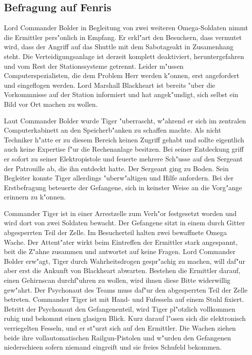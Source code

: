 \subsection{Befragung auf Fenris}

Lord Commander Bolder in Begleitung von zwei weiteren Omega-Soldaten nimmt die Ermittler pers"onlich in Empfang. Er erkl"art den Besuchern, dass vermutet wird, dass der Angriff auf das Shuttle mit dem Sabotageakt in Zusamenhang steht. Die Verteidigungsanlage ist derzeit komplett deaktiviert, heruntergefahren und vom Rest der Stationssysteme getrennt. Leider m"ussen Computerspezialisten, die dem Problem Herr werden k"onnen, erst angefordert und eingeflogen werden. Lord Marshall Blackheart ist bereits "uber die Vorkommnisse auf der Station informiert und hat angek"undigt, sich selbst ein Bild vor Ort machen zu wollen.

Laut Commander Bolder wurde Tiger "uberrascht, w"ahrend er sich im zentralen Computerkabinett an den Speicherb"anken zu schaffen machte. Als nicht Techniker h"atte er zu diesem Bereich keinen Zugriff gehabt und sollte eigentlich auch  keine Expertise f"ur die Rechenanlage besitzen. Bei seiner Entdeckung griff er sofort zu seiner Elektropistole und feuerte mehrere Sch"usse auf den Sergeant der Patrouille ab, die ihn entdeckt hatte. Der Sergeant ging zu Boden. Sein Begleiter konnte Tiger allerdings "uberw"altigen und Hilfe anfordern. Bei der Erstbefragung beteuerte der Gefangene, sich in keinster Weise an die Vorg"ange erinnern zu k"onnen.

Commander Tiger ist in einer Arrestzelle zum Verh"or festgesetzt worden und wird dort von zwei Soldaten bewacht. Der Gefangene sitzt in einem durch Gitter abgesperrten Teil der Zelle. Im Besucherteil halten zwei bewaffnete Omega Wache. Der Attent"ater wirkt beim Eintreffen der Ermittler stark angespannt, bei\3t die Z"ahne zusammen und antwortet auf keine Fragen. Lord Commander Bolder erw"agt, Tiger durch Wahrheitsdrogen gespr"achig zu machen, will daf"ur aber erst die Ankunft von Blackheart abwarten. Bestehen die Ermittler darauf, einen Gehirnscan durchf"uhren zu wollen, wird ihnen diese Bitte widerwillig gew"ahrt. Der Psychonaut des Teams muss daf"ur den abgesperrten Teil der Zelle betreten. Commander Tiger ist mit Hand- und Fu\3fesseln auf einem Stuhl fixiert. Betritt der Psychonaut den Gefangenenteil, wird Tiger pl"otzlich vollkommen ruhig und bekommt einen glasigen Blick. Kurz darauf l"osen sich die elektronisch verriegelten Fesseln, und er st"urzt sich auf den Ermittler. Die Wachen ziehen beide ihre vollautomatischen Railgun-Pistolen und w"urden den Gefangenen niederschie\3en sofern niemand eingreift und sie freies Schu\3feld bekommen.

